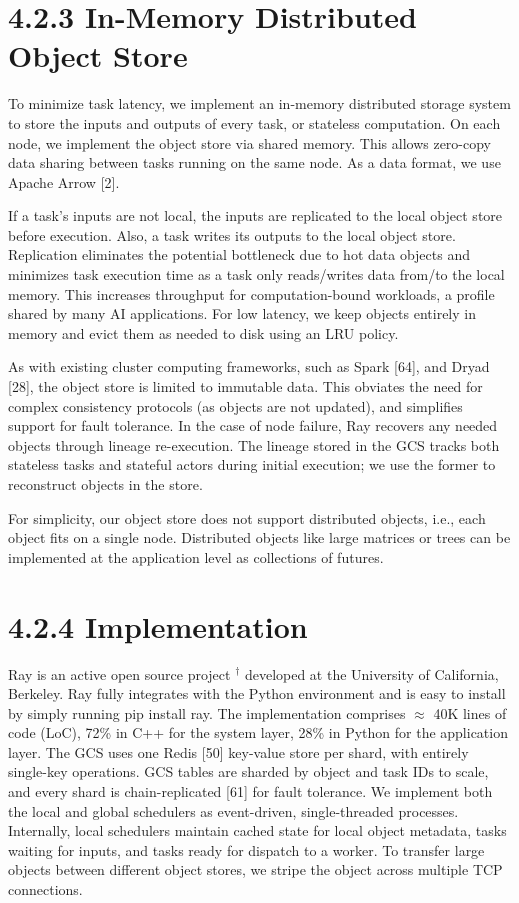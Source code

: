 \documentclass[
]{article}
\begin{document}
\section{4.2.3 In-Memory Distributed Object
Store}\label{in-memory-distributed-object-store}

To minimize task latency, we implement an in-memory distributed storage
system to store the inputs and outputs of every task, or stateless
computation. On each node, we implement the object store via shared
memory. This allows zero-copy data sharing between tasks running on the
same node. As a data format, we use Apache Arrow {[}2{]}.

If a task's inputs are not local, the inputs are replicated to the local
object store before execution. Also, a task writes its outputs to the
local object store. Replication eliminates the potential bottleneck due
to hot data objects and minimizes task execution time as a task only
reads/writes data from/to the local memory. This increases throughput
for computation-bound workloads, a profile shared by many AI
applications. For low latency, we keep objects entirely in memory and
evict them as needed to disk using an LRU policy.

As with existing cluster computing frameworks, such as Spark {[}64{]},
and Dryad {[}28{]}, the object store is limited to immutable data. This
obviates the need for complex consistency protocols (as objects are not
updated), and simplifies support for fault tolerance. In the case of
node failure, Ray recovers any needed objects through lineage
re-execution. The lineage stored in the GCS tracks both stateless tasks
and stateful actors during initial execution; we use the former to
reconstruct objects in the store.

For simplicity, our object store does not support distributed objects,
i.e., each object fits on a single node. Distributed objects like large
matrices or trees can be implemented at the application level as
collections of futures.

\section{4.2.4 Implementation}\label{implementation}

Ray is an active open source project \(^{†}\) developed at the
University of California, Berkeley. Ray fully integrates with the Python
environment and is easy to install by simply running pip install ray.
The implementation comprises \(\approx\) 40K lines of code (LoC), 72\%
in C++ for the system layer, 28\% in Python for the application layer.
The GCS uses one Redis {[}50{]} key-value store per shard, with entirely
single-key operations. GCS tables are sharded by object and task IDs to
scale, and every shard is chain-replicated {[}61{]} for fault tolerance.
We implement both the local and global schedulers as event-driven,
single-threaded processes. Internally, local schedulers maintain cached
state for local object metadata, tasks waiting for inputs, and tasks
ready for dispatch to a worker. To transfer large objects between
different object stores, we stripe the object across multiple TCP
connections.
\end{document}
